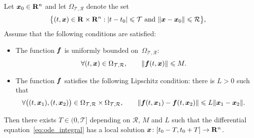 \label{sec:existence}
\begin{theorem}
    \label{theorem:existence}
    Let $\mathbf{\boldsymbol{x}}_0 \in \mathbf R^n$ and let $\Omega_{\mathcal T, \mathcal R}$ denote the set
    \[
        \bigl\{(t, \mathbf{\boldsymbol{x}}) \in \mathbf R \times \mathbf R^n: \lvert t-t_0\rvert \leqslant \mathcal T \text{ and } \lVert\mathbf{\boldsymbol{x}} - \mathbf{\boldsymbol{x}}_0\rVert \leqslant \mathcal R \bigr\},
    \]
    Assume that the following conditions are satisfied:
    \begin{itemize}
        \item
            The function $\mathbf{\boldsymbol{f}}$ is uniformly bounded on~$\Omega_{\mathcal T, \mathcal R}$:
            \begin{equation}
                \label{eq:boundedness_ode}
                \forall (t, \mathbf{\boldsymbol{x}}) \in \Omega_{\mathcal T, \mathcal R}, \qquad
                \lVert\mathbf{\boldsymbol{f}}(t, \mathbf{\boldsymbol{x}})\rVert \leqslant M.
            \end{equation}

        \item
            The function $\mathbf{\boldsymbol{f}}$ satisfies the following Lipschitz condition:
            there is $L > 0$ such that
            \begin{equation}
                \label{eq:local_lipschitz_ode}
                \forall \bigl((t, \mathbf{\boldsymbol{x}}_1), (t, \mathbf{\boldsymbol{x}}_2)\bigr) \in \Omega_{\mathcal T, \mathcal R} \times \Omega_{\mathcal T, \mathcal R}, \qquad
                \lVert \mathbf{\boldsymbol{f}}(t, \mathbf{\boldsymbol{x}}_1) - \mathbf{\boldsymbol{f}}(t, \mathbf{\boldsymbol{x}}_2) \rVert \leqslant L \lVert\mathbf{\boldsymbol{x}}_1 - \mathbf{\boldsymbol{x}}_2\rVert.
            \end{equation}
    \end{itemize}
    Then there exists $T \in (0, \mathcal T]$ depending on $\mathcal R$, $M$ and $L$ such that
    the differential equation~\eqref{eq:ode_integral} has a local solution $\mathbf{\boldsymbol{x}}\colon [t_0 - T, t_0 + T] \to \mathbf R^n$.
\end{theorem}
